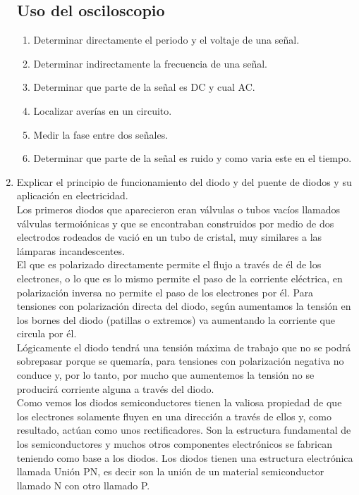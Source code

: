 \documentclass[a4paper,12pt]{report}
\begin{document}
\begin{enumerate}
\subsection*{Uso del osciloscopio}
\begin{enumerate}
\item Determinar directamente el periodo y el voltaje de una señal.
\item Determinar indirectamente la frecuencia de una señal.
\item Determinar que parte de la señal es DC y cual AC.
\item Localizar averías en un circuito.
\item Medir la fase entre dos señales.
\item Determinar que parte de la señal es ruido y como varia este en el tiempo.
\end{enumerate}
\item Explicar el principio de funcionamiento del diodo y del puente de diodos y su aplicación en electricidad. \\
Los primeros diodos que aparecieron eran válvulas o tubos vacíos llamados válvulas termoiónicas y que se encontraban construidos por medio de dos electrodos rodeados de vació en un tubo de cristal, muy similares a las lámparas incandescentes.\\
El que es polarizado directamente permite el flujo a través de él de los electrones, o lo que es lo mismo permite el paso de la corriente eléctrica, en polarización inversa no permite el paso de los electrones por él.
Para tensiones con polarización directa del diodo, según aumentamos la tensión en los bornes del diodo (patillas o extremos) va aumentando la corriente que circula por él.\\
Lógicamente el diodo tendrá una tensión máxima de trabajo que no se podrá sobrepasar porque se quemaría, para tensiones con polarización negativa no conduce y, por lo tanto, por mucho que aumentemos la tensión no se producirá corriente alguna a través del diodo.\\
Como vemos los diodos semiconductores tienen la valiosa propiedad de que los electrones solamente fluyen en una dirección a través de ellos y, como resultado, actúan como unos rectificadores.
Son la estructura fundamental de los semiconductores y muchos otros componentes electrónicos se fabrican teniendo como base a los diodos. Los diodos tienen una estructura electrónica llamada Unión PN, es decir son la unión de un material semiconductor llamado N con otro llamado P.\\

\end{enumerate}
\end{document}
